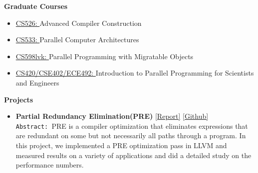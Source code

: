 \documentclass[9pt]{article}
\newenvironment{changemargin}[2]{%
  \begin{list}{}{%
    \setlength{\topsep}{0pt}%
    \setlength{\leftmargin}{#1}%
    \setlength{\rightmargin}{#2}%
    \setlength{\listparindent}{\parindent}%
    \setlength{\itemindent}{\parindent}%
    \setlength{\parsep}{\parskip}%
  }%
  \item[]}{\end{list}
}
\newenvironment{body} {
	\vspace*{-16pt}
	\begin{changemargin}{-0.25in}{-0.5in}
  }	
	{\end{changemargin}
}
\begin{document}
\begin{body}
	\vspace{14pt}
	\textbf{Graduate Courses }{} \hfill \\
	\begin{itemize} \itemsep -0pt
          \item \href{https://cs.illinois.edu/courses/profile/CS526}{CS526: }Advanced Compiler Construction
          \item \href{https://courses.engr.illinois.edu/cs533/}{CS533: }Parallel Computer Architectures
          \item \href{https://wiki.cites.illinois.edu/wiki/display/cs598lvk/Home}{CS598lvk: }Parallel Programming with Migratable Objects
          \item  \href{https://cs.illinois.edu/courses/profile/CS420}{CS420/CSE402/ECE492: }
                                            Introduction to Parallel Programming for Scientists and Engineers
	\end{itemize}
 \medskip
	\textbf{Projects}{} \hfill  \\
	\begin{itemize} \itemsep -0pt
           \item \textbf{Partial Redundancy Elimination(PRE)} 
           \href{http://web.engr.illinois.edu/~sdasgup3/Document/report_cs526.pdf}{[Report]} 
           \href{https://github.com/sdasgup3/PartialRedundancyElimination}{[Github]} \\
                                  \texttt{Abstract: }PRE is a compiler optimization that
                                  eliminates expressions that are redundant on
                                  some but not necessarily all paths through a
                                  program. In this project, we implemented a PRE
                                  optimization pass in LLVM and measured results
                                  on a variety of applications and did a
                                  detailed study on the performance numbers.


\end{itemize}
\end{body}
\end{document}
